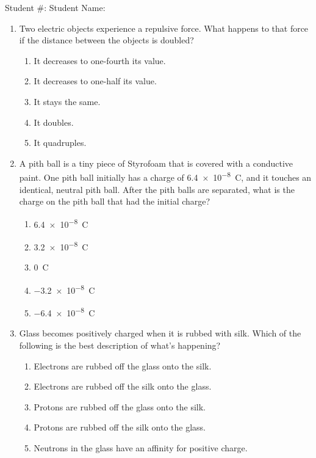 \documentclass[12pt]{article}
\begin{document}
\begin{center}
  Student \#: \underline{\hspace{1in}}\hspace{1.9in}
  Student Name: \underline{\hspace{2in}}\\
  \vspace{0.3in}{\LARGE
    AP Physics Class 10 \& 11: Electrostatics \& Gauss's Law}
\end{center}

\begin{enumerate}[leftmargin=50pt,label=\underline{\hspace{0.4in}} \arabic*.]

\item Two electric objects experience a repulsive force. What happens to that
  force if the distance between the objects is doubled?
  \begin{enumerate}[noitemsep,topsep=0pt,leftmargin=18pt,label=(\Alph*)]
  \item It decreases to one-fourth its value.
  \item It decreases to one-half its value.
  \item It stays the same.
  \item It doubles.
  \item It quadruples.
  \end{enumerate}

\item A pith ball is a tiny piece of Styrofoam that is covered with a
  conductive paint. One pith ball initially has a charge of \SI{6.4e-8}{C},
  and it touches an identical, neutral pith ball. After the pith balls are
  separated, what is the charge on the pith ball that had the initial charge?
  \begin{enumerate}[noitemsep,topsep=0pt,leftmargin=18pt,label=(\Alph*)]
  \item\SI{6.4e-8}{C}
  \item\SI{3.2e-8}{C}
  \item\SI{0}{C}
  \item\SI{-3.2e-8}{C}
  \item\SI{-6.4e-8}{C}
  \end{enumerate}

\item Glass becomes positively charged when it is rubbed with silk. Which
  of the following is the best description of what’s happening?
  \begin{enumerate}[noitemsep,topsep=0pt,leftmargin=18pt,label=(\Alph*)]
  \item Electrons are rubbed off the glass onto the silk.
  \item Electrons are rubbed off the silk onto the glass.
  \item Protons are rubbed off the glass onto the silk.
  \item Protons are rubbed off the silk onto the glass.
  \item Neutrons in the glass have an affinity for positive charge.
  \end{enumerate}
  

\end{enumerate}
\end{document}

